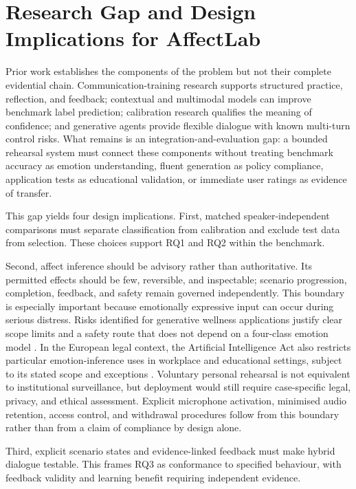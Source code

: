 \section{Research Gap and Design Implications for AffectLab}
\label{sec:sota-ethics}
\label{sec:sota-evaluation}
\label{sec:sota-synthesis}
\label{sec:sota-gap}

Prior work establishes the components of the problem but not their complete evidential chain. Communication-training research supports structured practice, reflection, and feedback; contextual and multimodal models can improve benchmark label prediction; calibration research qualifies the meaning of confidence; and generative agents provide flexible dialogue with known multi-turn control risks. What remains is an integration-and-evaluation gap: a bounded rehearsal system must connect these components without treating benchmark accuracy as emotion understanding, fluent generation as policy compliance, application tests as educational validation, or immediate user ratings as evidence of transfer.

This gap yields four design implications. First, matched speaker-independent comparisons must separate classification from calibration and exclude test data from selection. These choices support RQ1 and RQ2 within the benchmark.

Second, affect inference should be advisory rather than authoritative. Its permitted effects should be few, reversible, and inspectable; scenario progression, completion, feedback, and safety remain governed independently. This boundary is especially important because emotionally expressive input can occur during serious distress. Risks identified for generative wellness applications justify clear scope limits and a safety route that does not depend on a four-class emotion model \cite{defreitas2024wellness}. In the European legal context, the Artificial Intelligence Act also restricts particular emotion-inference uses in workplace and educational settings, subject to its stated scope and exceptions \cite{eu2024aiact}. Voluntary personal rehearsal is not equivalent to institutional surveillance, but deployment would still require case-specific legal, privacy, and ethical assessment. Explicit microphone activation, minimised audio retention, access control, and withdrawal procedures follow from this boundary rather than from a claim of compliance by design alone.

Third, explicit scenario states and evidence-linked feedback must make hybrid dialogue testable. This frames RQ3 as conformance to specified behaviour, with feedback validity and learning benefit requiring independent evidence.

